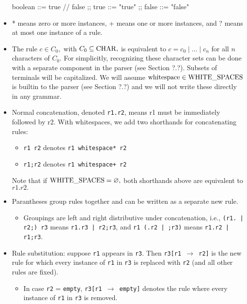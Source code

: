 \begin{itemize}
\begin{bnf}
  boolean ::= true // false ;; true ::= "true" ;; false ::= "false"
\end{bnf}
  \item * means zero or more instances, + means one or more instances, and ? means at most one instance of a rule.
  \item The rule $c \in C_{0},$ with $C_{0} \subseteq \mathrm{CHAR},$ is equivalent to $c = c_{0} \; | \; \dots \; | \; c_{n}$ for all $n$ characters of $C_{0}.$ For simplicitly, recognizing these character sets can be done with a separate component in the parser (see Section ?.?). Subsets of terminals will be capitalized. We will assume $\textrm{whitespace} \in \mathrm{WHITE\_SPACES}$ is builtin to the parser (see Section ?.?) and we will not write these directly in any grammar.
  \item Normal concatenation, denoted \texttt{r1.r2}, means r1 must be immediately followed by r2. With whitespaces, we add two shorthands for concatenating rules:
  \begin{itemize}
    \item \texttt{r1 r2} denotes \texttt{r1 whitespace* r2}
    \item \texttt{r1;r2} denotes \texttt{r1 whitespace+ r2}
  \end{itemize}
  Note that if $\mathrm{WHITE\_SPACES} = \varnothing,$ both shorthands above are equivalent to $r1.r2.$
  \item Parantheses group rules together and can be written as a separate new rule.
  \begin{itemize}
    \item Groupings are left and right distributive under concatenation, i.e., \texttt{(r1. | r2;) r3} means \texttt{r1.r3 | r2;r3}, and \texttt{r1 (.r2 | ;r3)} means \texttt{r1.r2 | r1;r3}.
  \end{itemize}
  \item Rule substitution: suppose \texttt{r1} appears in \texttt{r3}. Then \texttt{r3[r1 $\to$ r2]} is the new rule for which every instance of \texttt{r1} in \texttt{r3} is replaced with \texttt{r2} (and all other rules are fixed). %
    \begin{itemize}
    \item In case \texttt{r2} = \texttt{empty}, \texttt{r3[r1 $\to$ empty]} denotes the rule where every instance of \texttt{r1} in \texttt{r3} is removed.
    \end{itemize}
\end{itemize}

